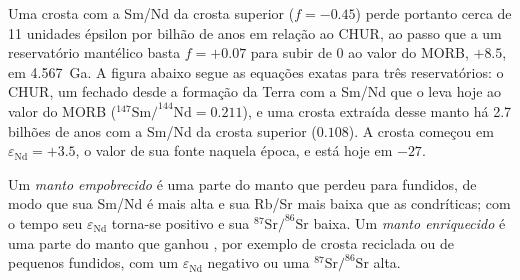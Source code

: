 Uma crosta com a Sm/Nd da crosta superior ($f = -0.45$) perde portanto cerca de
11 unidades épsilon por bilhão de anos em relação ao CHUR, ao passo que a um reservatório mantélico
basta $f = +0.07$ para subir de 0 ao valor do MORB, $+8.5$, em
\qty{4.567}{Ga}. A figura abaixo segue as equações exatas para três
reservatórios: o CHUR, um  fechado desde a formação da Terra com a Sm/Nd
que o leva hoje ao valor do MORB ($^{147}\mathrm{Sm}/^{144}\mathrm{Nd} =
0.211$), e uma crosta extraída desse manto há 2.7 bilhões de anos com a
Sm/Nd da crosta superior ($0.108$). A crosta começou em $\varepsilon_{\mathrm{Nd}} =
+3.5$, o valor de sua fonte naquela época, e está hoje em $-27$.

\begin{definition}\label{def:b2:isotope-geochemistry:reservoirs}
Um \emph{manto empobrecido} é uma parte do manto que
perdeu  para fundidos, de modo que sua Sm/Nd é mais alta e sua Rb/Sr
mais baixa que as condríticas; com o tempo seu $\varepsilon_{\mathrm{Nd}}$ torna-se positivo e
sua $^{87}\mathrm{Sr}/^{86}\mathrm{Sr}$ baixa. Um \emph{manto
enriquecido} é uma parte do manto que ganhou
, por exemplo de crosta reciclada ou de pequenos fundidos,
com um $\varepsilon_{\mathrm{Nd}}$ negativo ou uma $^{87}\mathrm{Sr}/^{86}\mathrm{Sr}$ alta.
\end{definition}

